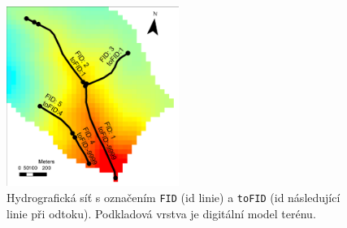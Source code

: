 \begin{figure}[t!]
  \centering
  \includegraphics[width=0.5\textwidth]{img/mapalinie}
  \caption{Hydrografická síť s označením {\tt FID} (id linie) a {\tt toFID} (id následující linie při odtoku). Podkladová vrstva je digitální model terénu.}
  \label{fig:mapalinie}
\end{figure}











